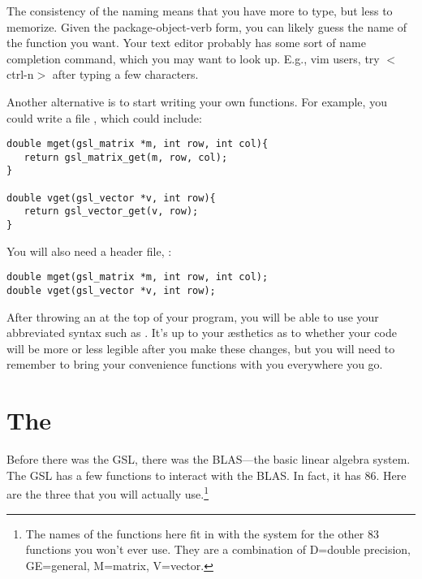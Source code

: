 The consistency of the naming means that you have more to type, but
less to memorize. Given the package-object-verb form, you can likely
guess the name of the function you want. Your text editor probably has
some sort of name completion command, which you may want to look up. E.g.,
vim users, try $<$ctrl-n$>$ after typing a few characters.

Another alternative is to start writing your own functions. For example, you
could write a file , which could include:

\begin{lstlisting}
double mget(gsl_matrix *m, int row, int col){
   return gsl_matrix_get(m, row, col);
}

double vget(gsl_vector *v, int row){
   return gsl_vector_get(v, row);
}
\end{lstlisting}

You will also need a header file, :
\begin{lstlisting}
double mget(gsl_matrix *m, int row, int col);
double vget(gsl_vector *v, int row);
\end{lstlisting}

After throwing an  at the top of your
program, you will be able to use your abbreviated syntax such as .
It's up to your \ae sthetics as to whether your code will be more or less
legible after you make these changes, but you will need to remember to
bring your convenience functions with you everywhere you go.



\section{The } 
 
Before there was the GSL, there was the BLAS---the basic linear algebra
system. The GSL has a few functions to interact with the BLAS. In fact,
it has 86. Here are the three that you will actually use.\footnote{
The names of the functions here fit in with the system for the other 83
functions you won't ever use. They are a combination of D=double precision,
GE=general, M=matrix, V=vector.}

